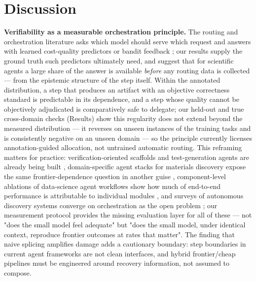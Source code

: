\section{Discussion}
\label{sec:discussion}

\textbf{Verifiability as a measurable orchestration principle.} The routing and orchestration literature asks which model should serve which request and answers with learned cost-quality predictors or bandit feedback \cite{li2026progrouter,sun2026cborchestrator,koul2026register,cao2026taskspecific}; our results supply the ground truth such predictors ultimately need, and suggest that for scientific agents a large share of the answer is available \emph{before} any routing data is collected --- from the epistemic structure of the step itself. Within the annotated distribution, a step that produces an artifact with an objective correctness standard is predictable in its dependence, and a step whose quality cannot be objectively adjudicated is comparatively safe to delegate; our held-out and true cross-domain checks (Results) show this regularity does not extend beyond the measured distribution --- it reverses on unseen instances of the training tasks and is consistently negative on an unseen domain --- so the principle currently licenses annotation-guided allocation, not untrained automatic routing. This reframing matters for practice: verification-oriented scaffolds and test-generation agents are already being built \cite{lee2025learning,kapetanovic2026phased}, domain-specific agent stacks for materials discovery expose the same frontier-dependence question in another guise \cite{rothfarb2025hierarchical}, component-level ablations of data-science agent workflows show how much of end-to-end performance is attributable to individual modules \cite{huang2026llmgenerated}, and surveys of autonomous discovery systems converge on orchestration as the open problem \cite{zhou2025autonomous}; our measurement protocol provides the missing evaluation layer for all of these --- not "does the small model feel adequate" but "does the small model, under identical context, reproduce frontier outcomes at rates that matter". The finding that naive splicing amplifies damage adds a cautionary boundary: step boundaries in current agent frameworks are not clean interfaces, and hybrid frontier/cheap pipelines must be engineered around recovery information, not assumed to compose.

